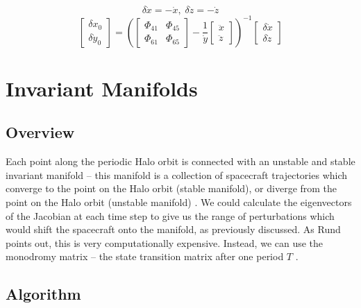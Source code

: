 \documentclass[conf]{new-aiaa}
\begin{document}
\begin{multicols}{2}
\begin{equation}
    \delta \dot{x} = -\dot{x},\; \delta \dot{z} = -\dot{z}
\end{equation}
\begin{equation}
    \begin{bmatrix} \delta x_0 \\ \delta \dot{y}_0 \end{bmatrix} = 
    \left( \begin{bmatrix} \Phi_{4 1} & \Phi_{4 5} \\ \Phi_{6 1} & \Phi_{6 5} \end{bmatrix} - 
    \frac{1}{\dot{y}} \begin{bmatrix} \ddot{x} \\ \ddot{z} \end{bmatrix} \right)^{-1} 
    \begin{bmatrix} \delta \dot{x} \\ \delta \dot{z} \end{bmatrix}
\end{equation}

\section{Invariant Manifolds}

\subsection{Overview}

Each point along the periodic Halo orbit is connected with an unstable and stable 
invariant manifold -- this manifold is a collection of spacecraft trajectories 
which converge to the point on the Halo orbit (stable manifold), or diverge from 
the point on the Halo orbit (unstable manifold) \cite{rund2018interplanetary}.
We could calculate the eigenvectors of the Jacobian at each time step to give us the 
range of perturbations which would shift the spacecraft onto the manifold, as previously 
discussed. As Rund points out, this is very computationally expensive. Instead, we can 
use the monodromy matrix -- the state transition matrix after one period $T$ 
\cite{rund2018interplanetary}.

\subsection{Algorithm}


\end{multicols}
\end{document}
